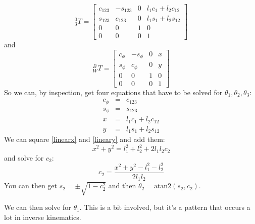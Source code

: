 \documentclass[]{article}
\begin{document}
\begin{displaymath}
^{0}_{3}T = \left[ \begin{array}{ccc|c} c_{123} & -s_{123} & 0 & l_{1}c_{1}+l_{2}c_{12} \\ s_{123} & c_{123} & 0 & l_{1}s_{1} + l_{2}s_{12} \\ 0 & 0 & 1 & 0 \\ \hline 0 & 0 & 0 & 1
\end{array}\right]
\end{displaymath}
and
\begin{displaymath}
^{B}_{W}T = \left[ \begin{array}{ccc|c} c_{\phi} & -s_{\phi} & 0 & x \\ s_{\phi} & c_{\phi} & 0 & y \\ 0 & 0 & 1 & 0 \\ \hline 0 & 0 & 0 & 1
\end{array}\right]
\end{displaymath}
So we can, by inspection, get four equations that have to be solved for $\theta_{1}, \theta_{2}, \theta_{3}$:
\begin{eqnarray}
c_{\phi} & = & c_{123} \label{linearc} \\
s_{\phi} & = & s_{123} \label{linears} \\
x & = & l_{1}c_{1}+l_{2}c_{12} \label{linearx} \\
y & = & l_{1}s_{1} + l_{2}s_{12} \label{lineary}
\end{eqnarray}
We can square \ref{linearx} and \ref{lineary} and add them:
\begin{displaymath}
x^{2}+y^{2} = l_{1}^{2} + l_{2}^{2} + 2l_{1}l_{2}c_{2}
\end{displaymath}
and solve for $c_{2}$:
\begin{displaymath}
c_{2}=\frac{x^{2}+y^{2}-l_{1}^{2}-l_{2}^{2}}{2l_{1}l_{2}}
\end{displaymath}
You can then get $s_{2} = \pm \sqrt{1-c_{2}^{2}}$ and then $\theta_{2} = \text{atan2}(s_{2}, c_{2})$.

We can then solve for $\theta_{1}$. This is a bit involved, but it's a pattern that occurs a lot in inverse kinematics.
\end{document}
